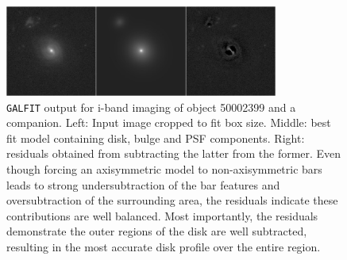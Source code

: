 \documentclass[11pt,twocolumn]{article}
\begin{document}
\begin{figure}[t]
\centering
\includegraphics[width=0.8\textwidth]{Together}
\caption{{\tt GALFIT} output for i-band imaging of object 50002399 and a companion. Left: Input image cropped to fit box size. Middle: best fit model containing disk, bulge and PSF components. Right: residuals obtained from subtracting the latter from the former. Even though forcing an axisymmetric model to non-axisymmetric bars leads to strong undersubtraction of the bar features and oversubtraction of the surrounding area, the residuals indicate these contributions are well balanced. Most importantly, the residuals demonstrate the outer regions of the disk are well subtracted, resulting in the most accurate disk profile over the entire region.}\label{examplefigure}
\end{figure}
\end{document}
